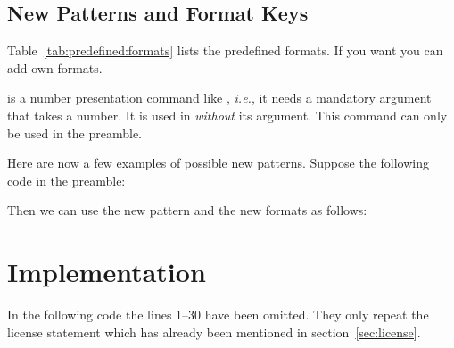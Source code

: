 \documentclass[toc=index,toc=bib,numbers=noendperiod]{cnpkgdoc}
\newcommand*\myoddnumber[1]{\the\numexpr2*(#1)-1\relax}
\begin{document}
\subsection{New Patterns and Format Keys}
Table~\ref{tab:predefined:formats} lists the predefined formats. If you want you
can add own formats.
\begin{beschreibung}
 \newline
    is a number presentation command like , \textit{i.e.},
   it needs a mandatory argument that takes a number. It is used in 
   \emph{without} its argument. This command can only be used in the preamble.
\end{beschreibung}

Here are now a few examples of possible new patterns. Suppose the following code
in the preamble:
\begin{beispiel}
 \usepackage{alphalph,fmtcount}
 \newcommand*\myoddnumber[1]{\the\numexpr2*(#1)-1\relax}


 \setcounter{testa}{4}
\end{beispiel}

Then we can use the new pattern and the new formats as follows:\setcounter{testa}{4}
\begin{beispiel}
\end{beispiel}

\section{Implementation}
In the following code the lines 1--30 have been omitted. They only repeat the
license statement which has already been mentioned in section~\ref{sec:license}.

\implementation[linerange={31-1000},firstnumber=31]


\printindex
\end{document}
